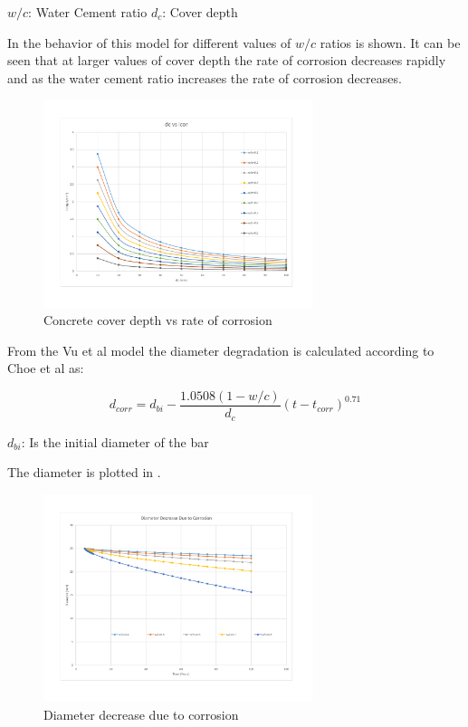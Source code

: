 $w/c$: Water Cement ratio
$d_c$: Cover depth

In  the behavior of this model for different values of $w/c$ ratios is shown. It can be seen that at larger values of cover depth the rate of corrosion decreases rapidly and as the water cement ratio increases the rate of corrosion decreases.
%
\begin{figure}[htbp]
\centering
\includegraphics[width=0.7\textwidth]{Chapter-1/figs/dcvsicor}
\caption{Concrete cover depth vs rate of corrosion}
\label{fig:hist1}
\end{figure}

From the Vu et al model the diameter degradation is calculated according to Choe et al as:

\begin{equation}
  d_{corr}=d_{bi}-\frac{1.0508(1-w/c)}{d_c} (t-t_{corr})^{0.71}
  \label{eq.nine}
\end{equation} 

$d_{bi}$: Is the initial diameter of the bar

The diameter is plotted in .

\begin{figure}[htbp]
\centering
\includegraphics[width=0.7\textwidth]{Chapter-1/figs/DiameterDecrease}
\caption{Diameter decrease due to corrosion}
\label{fig:hist2}
\end{figure}

